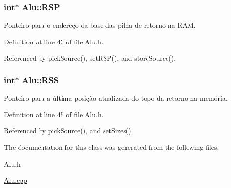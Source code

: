 \hypertarget{classAlu_ad6e5dacce0eecd38c727b6cc5877d05c}{
\subsubsection[{R\+S\+P}]{\setlength{\rightskip}{0pt plus 5cm}int$\ast$ Alu\+::\+R\+S\+P\hspace{0.3cm}{\ttfamily [private]}}}\label{classAlu_ad6e5dacce0eecd38c727b6cc5877d05c}
Ponteiro para o endereço da base das pilha de retorno na R\+A\+M. 

Definition at line 43 of file Alu.\+h.



Referenced by pick\+Source(), set\+R\+S\+P(), and store\+Source().

\hypertarget{classAlu_abd81e60239f46572212450b326f2261d}{
\subsubsection[{R\+S\+S}]{\setlength{\rightskip}{0pt plus 5cm}int$\ast$ Alu\+::\+R\+S\+S\hspace{0.3cm}{\ttfamily [private]}}}\label{classAlu_abd81e60239f46572212450b326f2261d}
Ponteiro para a última posição atualizada do topo da retorno na memória. 

Definition at line 45 of file Alu.\+h.



Referenced by pick\+Source(), and set\+Sizes().



The documentation for this class was generated from the following files\+:\begin{DoxyCompactItemize}
\item 
\hyperlink{Alu_8h}{Alu.\+h}\item 
\hyperlink{Alu_8cpp}{Alu.\+cpp}\end{DoxyCompactItemize}
